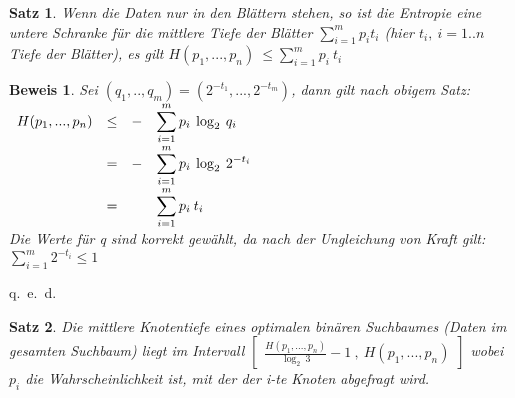 \documentclass[ngerman,draft,parskip=half*,twoside]{scrreprt}
\theoremstyle{break}
\newtheorem{beweis}{Beweis}
\newtheorem{satz}{Satz}
\begin{document}
\begin{satz}
 Wenn die Daten nur in den Blättern stehen, so ist die Entropie eine untere Schranke für die mittlere Tiefe
 der Blätter $\sum_{i=1}^m p_i t_i$ (hier $t_i,\:i=1..n$ Tiefe der Blätter), es gilt
 $H(p_1,...,p_n)\:\leq\sum_{i=1}^m p_i\:t_i$
\end{satz}
\begin{beweis}
Sei $(q_1,..,q_m)=(2^{-t_1},...,2^{-t_m})$, dann gilt nach obigem Satz:\\
$\begin{array}{cccl}
  H(p_1,...,p_n) & \leq & - &\displaystyle\sum_{i=1}^m p_i\:\log_2\:q_i \vspace{0.3mm}\\
                 & =    & - &\displaystyle\sum_{i=1}^m p_i\:\log_2\:2^{-t_i} \vspace{0.3mm}\\
                 & =    &   &\displaystyle\sum_{i=1}^m p_i\:t_i \\
\end{array}$\\
Die Werte für q sind korrekt gewählt, da nach der Ungleichung von Kraft gilt: $\sum_{i=1}^m 2^{-t_i}\leq1$
\end{beweis}
\begin{flushright} q.~e.~d. \end{flushright}
\begin{satz}
Die mittlere Knotentiefe eines optimalen binären Suchbaumes (Daten im gesamten Suchbaum) liegt im Intervall $
\begin{bmatrix}
  \displaystyle\frac{ H(p_1,...,p_n)}{\log_2\:3}-1\:,\:H(p_1,...,p_n)
\end{bmatrix}$
wobei $p_i$ die Wahrscheinlichkeit ist, mit der der i-te Knoten abgefragt wird.
\end{satz}
\end{document}
